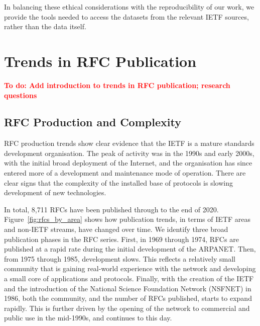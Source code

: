 \documentclass[twocolumn,10pt]{article}
\newcommand{\todo}[1]{\textbf{\textcolor{red}{To do: #1}}}
\newcommand{\pb}[1]{\vspace{0.75ex}\noindent{\textbf{#1}}}
\begin{document}
In balancing these ethical considerations with the reproducibility of our
work, we provide the tools needed to access the datasets from the relevant
IETF sources, rather than the data itself.


\section{Trends in RFC Publication}
\label{sec:trends-documents}


\todo{Add introduction to trends in RFC publication; research questions}

\subsection{RFC Production and Complexity}

RFC production trends show clear evidence that the IETF is a mature
standards development organisation. The peak of activity was in the 1990s
and early 2000s, with the initial broad deployment of the Internet, and the
organisation has since entered more of a development and maintenance mode
of operation. There are clear signs that the complexity of the installed
base of protocols is slowing development of new technologies.


\pb{RFC Publication Rate:}
In total, 8,711 RFCs have been published through to the end of 2020.
Figure~\ref{fig:rfcs_by_area} shows how publication trends, in terms of
IETF areas and non-IETF streams, have changed over time. We identify three
broad publication phases in the RFC series. First, in 1969 through 1974,
RFCs are published at a rapid rate during the initial development of the
ARPANET. Then, from 1975 through 1985, development slows. This reflects a
relatively small community that is gaining real-world experience with the
network and developing a small core of applications and protocols. Finally,
with the creation of the IETF and the introduction of the National Science
Foundation Network (NSFNET) in 1986, both the community, and the number of
RFCs published, starts to expand rapidly. This is further driven by the
opening of the network to commercial and public use in the mid-1990s, and
continues to this day.
\end{document}
